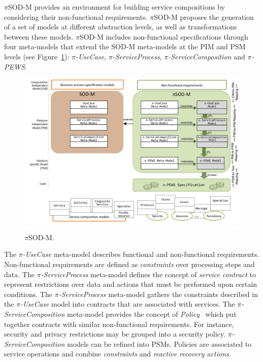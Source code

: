 $\pi$SOD-M provides an environment for building service compositions by considering their non-functional requirements. $\pi$SOD-M proposes the generation of a set of models at different abstraction levels, as well as transformations between these models.
$\pi$SOD-M includes non-functional specifications through
 four meta-models that extend the SOD-M meta-models at the PIM and PSM levels (see Figure~\ref{fig:piSOD-M}): \textit{$\pi$-UseCase}, \textit{$\pi$-ServiceProcess}, \textit{$\pi$-ServiceCom\-po\-si\-tion} and \textit{$\pi$-PEWS}.

\begin{figure}[t]
\centering
\includegraphics[width=1\textwidth]{figs/piSOD-M.png}
\caption{$\pi$SOD-M.}
\label{fig:piSOD-M}
\end{figure}
%
The \textit{$\pi$-UseCase} meta-model describes functional and non-functional requirements.
Non-functional requirements are defined as \textit{constraints} over processing steps and data. 
%
The \textit{$\pi$-ServiceProcess} meta-model defines the concept of \textit{service contract} to represent restrictions over data and actions that must be performed upon certain conditions. 
%
The \textit{$\pi$-ServiceProcess} meta-model gathers the constraints
described in the \textit{$\pi$-UseCase} model into contracts that are associated with services. 
%
The \textit{$\pi$-ServiceComposition} meta-model provides the concept of \textit{Policy}~\cite{Espinosa-Oviedo2011a}
which put together contracts with similar non-functional requirements. 
For instance, security and privacy restrictions may be grouped into a security policy.
\textit{$\pi$-ServiceComposition} models can be refined into PSMs. Policies are associated to service operations and combine \textit{constraints} and \textit{reactive recovery actions}.
